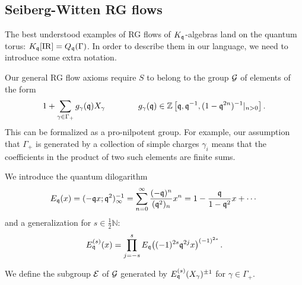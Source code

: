 \documentclass[12pt]{amsart}
\begin{document}
%
%

\subsection{Seiberg-Witten RG flows}
The best understood examples of RG flows of $K_{\mathfrak{q}}$-algebras land on the quantum torus: $K_{\mathfrak{q}}[\mathrm{IR}] = Q_{\mathfrak{q}}(\Gamma)$. 
In order to describe them in our language, we need to introduce some extra notation. 

Our general RG flow axioms require $S$ to belong to the 
group $\mathcal{G}$ of elements of the form
\begin{equation}
	1+\sum_{\gamma\in\Gamma_+} g_\gamma(\mathfrak{q})X_\gamma \qquad \qquad g_\gamma(\mathfrak{q})\in \mathbb{Z}\left[\mathfrak{q},\mathfrak{q}^{-1},(1-\mathfrak{q}^{2n})^{-1}|_{n>0}\right] .
\end{equation}
This can be formalized as a pro-nilpotent group. For example, our assumption that $\Gamma_+$ is generated by a collection of simple charges $\gamma_i$ means that the coefficients in the product of two such elements are finite sums. 

We introduce the quantum dilogarithm 
\begin{equation}
	E_{\mathfrak{q}}(x)=(-\mathfrak{q} x;\mathfrak{q}^2)^{-1}_\infty = \sum_{n=0}^\infty \frac{(-\mathfrak{q})^n}{(\mathfrak{q}^2)_n} x^n = 1 - \frac{\mathfrak{q}}{1-\mathfrak{q}^2} x + \cdots
\end{equation}
and a generalization for $s\in \tfrac12\mathbb{N}$:
\begin{equation}\label{eq:mult}
  E^{(s)}_{\mathfrak{q}}(x)=\prod_{j=-s}^{s}
    E_{\mathfrak{q}}\bigl((-1)^{2s}\mathfrak{q}^{2j}x\bigr)^{(-1)^{2s}} \,.
\end{equation}
\begin{definition}We define the subgroup $\mathcal{E}$ of $\mathcal{G}$ generated by $E^{(s)}_{\mathfrak{q}}(X_\gamma)^{\pm 1}$ for $\gamma \in \Gamma_+$.  
\end{definition}
\end{document}

